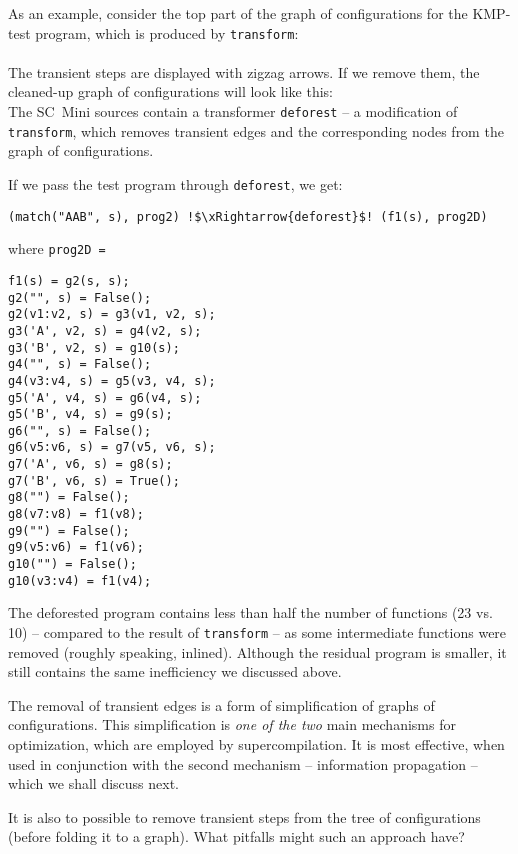 As an example, consider the top part of the graph of configurations 
for the KMP-test program, which is produced by 
\texttt{transform}:\\
\\
The transient steps are displayed with zigzag arrows.
If we remove them, the cleaned-up graph of configurations will look like this:\\


The SC~Mini sources contain a transformer \texttt{deforest} -- a modification
of \texttt{transform}, which removes transient edges and the corresponding nodes
from the graph of configurations.

If we pass the test program through \texttt{deforest}, we get:
\begin{lstlisting}[language=sll,escapechar=!]
(match("AAB", s), prog2) !$\xRightarrow{deforest}$! (f1(s), prog2D)
\end{lstlisting}
where \texttt{prog2D = }
\begin{lstlisting}[language=sll]
f1(s) = g2(s, s);
g2("", s) = False();
g2(v1:v2, s) = g3(v1, v2, s);
g3('A', v2, s) = g4(v2, s);
g3('B', v2, s) = g10(s);
g4("", s) = False();
g4(v3:v4, s) = g5(v3, v4, s);
g5('A', v4, s) = g6(v4, s);
g5('B', v4, s) = g9(s);
g6("", s) = False();
g6(v5:v6, s) = g7(v5, v6, s);
g7('A', v6, s) = g8(s);
g7('B', v6, s) = True();
g8("") = False();
g8(v7:v8) = f1(v8);
g9("") = False();
g9(v5:v6) = f1(v6);
g10("") = False();
g10(v3:v4) = f1(v4);
\end{lstlisting}

The deforested program contains less than half the number of functions (23 vs. 10)
-- compared to the result of \texttt{transform} --
as some intermediate functions were removed (roughly speaking, inlined).
Although the residual program is smaller, it still contains the same inefficiency 
we discussed above.

The removal of transient edges is a form of simplification of graphs of configurations.
This simplification is \emph{one of the two} main mechanisms for optimization,
which are employed by supercompilation. 
It is most effective, when used in conjunction with the second mechanism
-- information propagation -- which we shall discuss next.

\begin{exercise}
It is also to possible to remove transient steps from the tree of configurations (before folding it to a graph).
What pitfalls might such an approach have?
\end{exercise}

